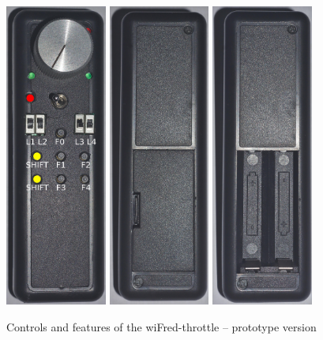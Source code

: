 \documentclass[11pt,a4paper]{scrartcl}
\begin{document}
\begin{figure}[tbh]  
  \centering
  \includegraphics[height=100mm]{images/throttle_Front}
  \hspace{1em}
  \includegraphics[height=100mm]{images/throttle_Back}
  \hspace{1em}
  \includegraphics[height=100mm]{images/throttle_Back_openBattery}
  \caption{Controls and features of the wiFred-throttle -- prototype version}
  \label{oldThrottleControls}
\end{figure}
\end{document}

